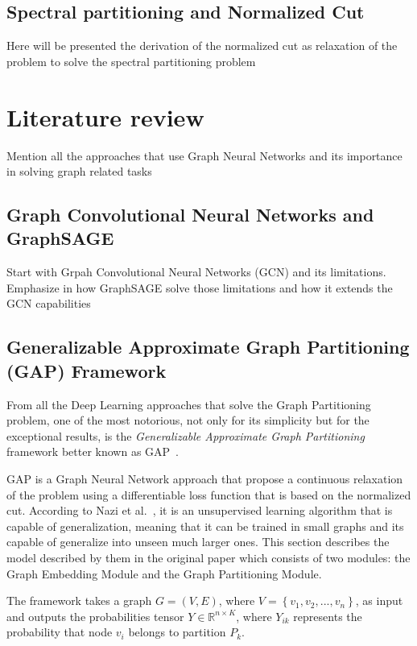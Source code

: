 \begin{comment}
\cite{hamilton}
\cite{gatti}
\cite{gap}
\end{comment}

\subsection{Spectral partitioning and Normalized Cut}
Here will be presented the derivation of the normalized cut as relaxation of the problem to solve the spectral partitioning problem

\section{Literature review}
Mention all the approaches that use Graph Neural Networks and its importance in solving graph related tasks
\subsection{Graph Convolutional Neural Networks and GraphSAGE}
Start with Grpah Convolutional Neural Networks (GCN) and its limitations. Emphasize in how GraphSAGE solve those limitations and how it extends the GCN capabilities
\subsection{Generalizable Approximate Graph Partitioning (GAP) Framework}
From all the Deep Learning approaches that solve the Graph Partitioning problem, one of the most notorious, not only for its simplicity but for the exceptional results, is the \textit{Generalizable Approximate Graph Partitioning} framework better known as GAP~\cite{gap}.

GAP is a Graph Neural Network approach that propose a continuous relaxation of the problem using a differentiable loss function that is based on the normalized cut. According to Nazi et al.~\cite{gap}, it is an unsupervised learning algorithm that is capable of generalization, meaning that it can be trained in small graphs and its capable of generalize into unseen much larger ones. This section describes the model described by them in the original paper which consists of two modules: the Graph Embedding Module and the Graph Partitioning Module.

The framework takes a graph $G = (V, E)$, where $V = \left\{ v_1, v_2, ..., v_n\right\}$, as input and outputs the probabilities tensor $Y\in \mathbb R^{n\times K}$, where $Y_{ik}$ represents the probability that node $v_i$ belongs to partition $P_k$. %

